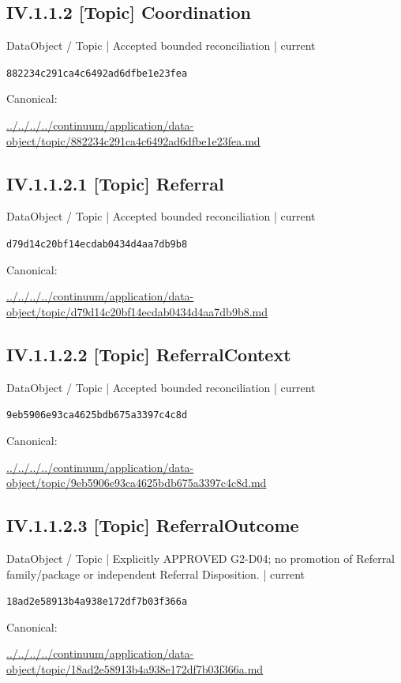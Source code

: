 \documentclass[10pt,a4paper]{article}
\begin{document}
\subsection*{IV.1.1.2 [Topic] Coordination}
\label{element-882234c291ca4c6492ad6dfbe1e23fea}
{\small DataObject / Topic | Accepted bounded reconciliation | current}\par
\texttt{882234c291ca4c6492ad6dfbe1e23fea}\par
Canonical: \par
{\footnotesize\url{../../../../continuum/application/data-object/topic/882234c291ca4c6492ad6dfbe1e23fea.md}}\par
\subsection*{IV.1.1.2.1 [Topic] Referral}
\label{element-d79d14c20bf14ecdab0434d4aa7db9b8}
{\small DataObject / Topic | Accepted bounded reconciliation | current}\par
\texttt{d79d14c20bf14ecdab0434d4aa7db9b8}\par
Canonical: \par
{\footnotesize\url{../../../../continuum/application/data-object/topic/d79d14c20bf14ecdab0434d4aa7db9b8.md}}\par
\subsection*{IV.1.1.2.2 [Topic] ReferralContext}
\label{element-9eb5906e93ca4625bdb675a3397c4c8d}
{\small DataObject / Topic | Accepted bounded reconciliation | current}\par
\texttt{9eb5906e93ca4625bdb675a3397c4c8d}\par
Canonical: \par
{\footnotesize\url{../../../../continuum/application/data-object/topic/9eb5906e93ca4625bdb675a3397c4c8d.md}}\par
\subsection*{IV.1.1.2.3 [Topic] ReferralOutcome}
\label{element-18ad2e58913b4a938e172df7b03f366a}
{\small DataObject / Topic | Explicitly APPROVED G2-D04; no promotion of Referral family/package or independent Referral Disposition. | current}\par
\texttt{18ad2e58913b4a938e172df7b03f366a}\par
Canonical: \par
{\footnotesize\url{../../../../continuum/application/data-object/topic/18ad2e58913b4a938e172df7b03f366a.md}}\par
\end{document}
